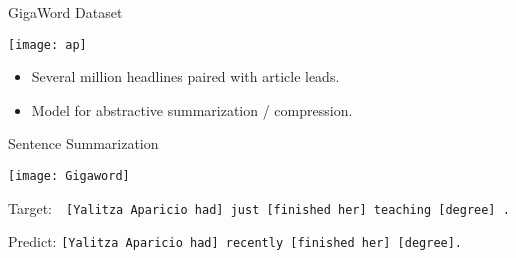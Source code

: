 \begin{frame}{GigaWord Dataset}

  \begin{center}
    \texttt{[image: ap]}
  \end{center}
  \begin{itemize}
  \item Several million headlines paired with article leads.
  \item Model for  abstractive summarization / compression.
  \end{itemize}
\end{frame}



\begin{frame}{Sentence Summarization}




  \begin{center}
    \texttt{[image: Gigaword]}
  \end{center}

Target:\  \
\texttt{[Yalitza Aparicio had] just [finished her] teaching [degree] .}
\air

Predict:
\texttt{[Yalitza Aparicio had] recently [finished her] [degree]. }


\end{frame}

